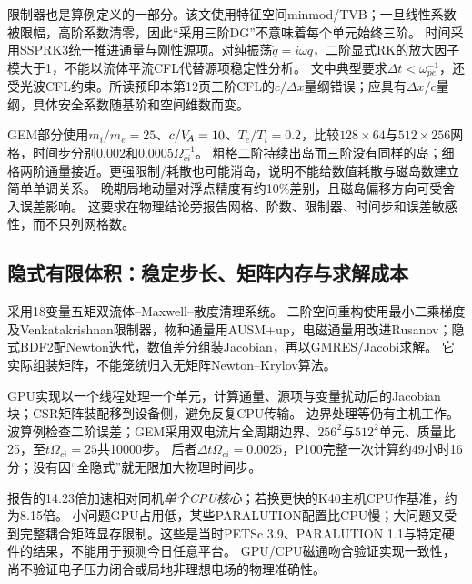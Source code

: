 \documentclass[UTF8,a4paper,11pt,openany,fontset=fandol]{ctexbook}
\begin{document}
限制器也是算例定义的一部分。该文使用特征空间minmod/TVB；一旦线性系数被限幅，高阶系数清零，因此“采用三阶DG”不意味着每个单元始终三阶。
时间采用SSPRK3统一推进通量与刚性源项。对纯振荡$\dot q=i\omega q$，二阶显式RK的放大因子模大于1，不能以流体平流CFL代替源项稳定性分析。
文中典型要求$\Delta t<\omega_{pe}^{-1}$，还受光波CFL约束。所读预印本第12页三阶CFL的$c/\Delta x$量纲错误；应具有$\Delta x/c$量纲，具体安全系数随基阶和空间维数而变。

GEM部分使用$m_i/m_e=25$、$c/V_{\!A}=10$、$T_e/T_i=0.2$，比较$128\times64$与$512\times256$网格，时间步分别$0.002$和$0.0005\Omega_{ci}^{-1}$。
粗格二阶持续出岛而三阶没有同样的岛；细格两阶通量接近。更强限制/耗散也可能消岛，说明不能给数值耗散与磁岛数建立简单单调关系。
晚期局地动量对浮点精度有约10\%差别，且磁岛偏移方向可受舍入误差影响。
这要求在物理结论旁报告网格、阶数、限制器、时间步和误差敏感性，而不只列网格数。

\subsection{隐式有限体积：稳定步长、矩阵内存与求解成本}
\citet{L243}采用18变量五矩双流体--Maxwell--散度清理系统。
二阶空间重构使用最小二乘梯度及Venkatakrishnan限制器，物种通量用AUSM+up，电磁通量用改进Rusanov；隐式BDF2配Newton迭代，数值差分组装Jacobian，再以GMRES/Jacobi求解。
它实际组装矩阵，不能笼统归入无矩阵Newton--Krylov算法。

GPU实现以一个线程处理一个单元，计算通量、源项与变量扰动后的Jacobian块；CSR矩阵装配移到设备侧，避免反复CPU传输。
边界处理等仍有主机工作。波算例检查二阶误差；GEM采用双电流片全周期边界、$256^2$与$512^2$单元、质量比25，至$t\Omega_{ci}=25$共10000步。
后者$\Delta t\Omega_{ci}=0.0025$，P100完整一次计算约49小时16分；没有因“全隐式”就无限加大物理时间步。

报告的14.23倍加速相对同机\emph{单个CPU核心}；若换更快的K40主机CPU作基准，约为8.15倍。
小问题GPU占用低，某些PARALUTION配置比CPU慢；大问题又受到完整耦合矩阵显存限制。这些是当时PETSc 3.9、PARALUTION 1.1与特定硬件的结果，不能用于预测今日任意平台。
GPU/CPU磁通吻合验证实现一致性，尚不验证电子压力闭合或局地非理想电场的物理准确性。
\end{document}
